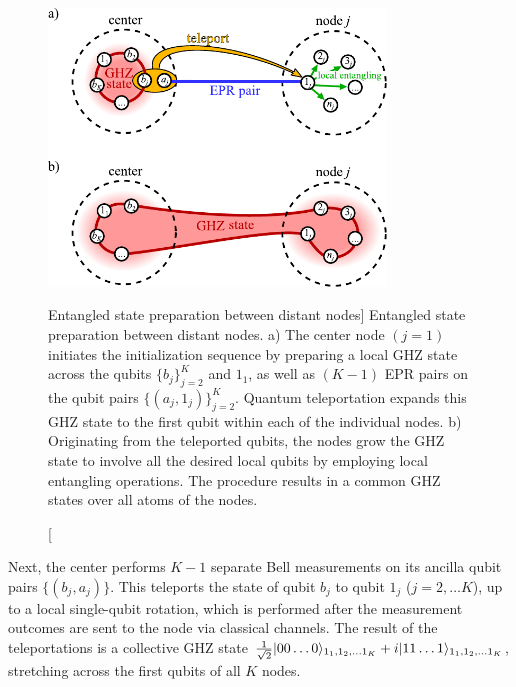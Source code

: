 \begin{figure}
\centering
\includegraphics[width=0.8\textwidth]{./figs_Komar2014/fig2.pdf}
\caption
[Entangled state preparation between distant nodes]
{
\label{fig:entangling}
Entangled state preparation between distant nodes.
a) The center node $(j=1)$ initiates the initialization sequence by preparing a
local GHZ state across the qubits $\{b_j\}_{j=2}^K$ and $1_1$, as well as $(K-1)$ EPR pairs on
the qubit pairs $\{(a_j,1_j)\}_{j=2}^K$.
Quantum teleportation expands this GHZ state to the first qubit within each of
the individual nodes.
b) Originating from the teleported qubits, the nodes grow the GHZ state to
involve all the desired local qubits by employing local entangling
operations.
The procedure results in a common GHZ states over all atoms of the nodes.
 }
\end{figure}


Next, the center performs $K-1$ separate Bell measurements on
 its ancilla qubit pairs $\{(b_j, a_j)\}$. This teleports the state of qubit $b_j$ to
 qubit $1_j$
($j=2,\dots K$), up to a local single-qubit rotation, which is performed
after the measurement outcomes are sent to the node via classical channels.
The result of the  teleportations is a collective GHZ state
$\frac{1}{\sqrt{2}}| 00\dots 0 \rangle_{1_1,1_2,\dots 1_K} + i | 11\dots
1 \rangle_{1_1,1_2,\dots 1_K}$, stretching across the first qubits of all $K$ nodes.

